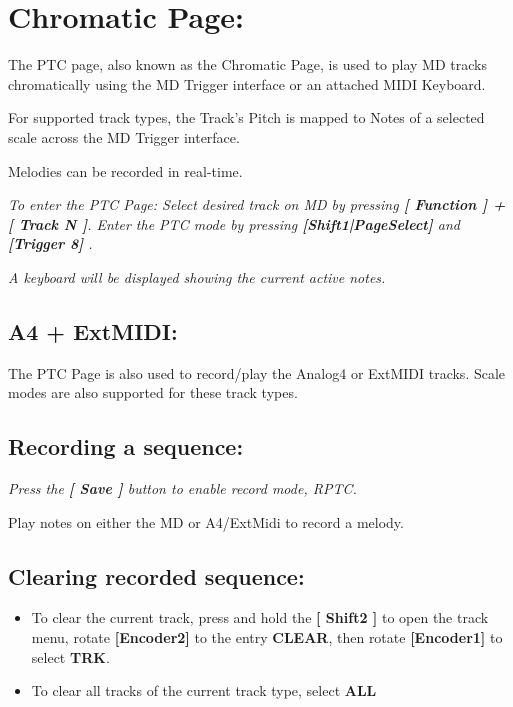 \chapter{Chromatic Page:}
The PTC page, also known as the Chromatic Page, is used to play MD tracks chromatically using the MD Trigger interface or an attached MIDI Keyboard.


For supported track types, the Track’s Pitch is mapped to Notes of a selected scale across the MD Trigger interface.

Melodies can be recorded in real-time.





\textit{To enter the PTC Page: Select desired track on MD by pressing \textbf{[ Function ] + [ Track N ]}. Enter the PTC mode by pressing \textbf{[Shift1|PageSelect]} and \textbf{[Trigger 8] }.}


\textit{A keyboard will be displayed showing the current active notes.}
\\

	
\section{A4 + ExtMIDI:}
The PTC Page is also used to record/play the Analog4 or ExtMIDI tracks. Scale modes are also supported for these track types.\\

\section{Recording a sequence:}
\textit{Press the \textbf{[ Save ] }button to enable record mode, RPTC.\\}

Play notes on either the MD or A4/ExtMidi to record a melody.

\vspace{-0.3cm}

\section{Clearing recorded sequence:}
\begin{itemize}
\item To clear the current track, press and hold the\textbf{ [ Shift2 ]} to open the track menu, rotate \textbf{[Encoder2]} to the entry \textbf{CLEAR}, then rotate \textbf{[Encoder1]} to select \textbf{TRK}.
\item To clear all tracks of the current track type, select \textbf{ALL}
\end{itemize}


